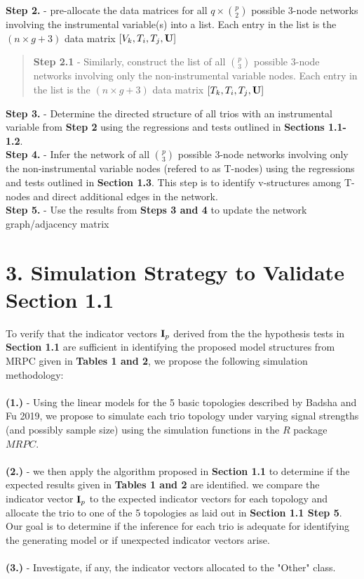 \documentclass[12pt]{report}
\begin{document}
\noindent \textbf{Step 2.} - pre-allocate the data matrices for all $q\times {p\choose 2}$ possible 3-node networks involving the instrumental variable(s) into a list. Each entry in the list is the $(n \times g+3)$ data matrix $[V_k, T_i, T_j, {\bf U}]$ 
\begin{quote}
\textbf{Step 2.1} - Similarly, construct the list of all $p\choose 3$ possible 3-node networks involving only the non-instrumental variable nodes. Each entry in the list is the $(n \times g+3)$ data matrix $[T_k, T_i, T_j, {\bf U}]$
\end{quote}


\noindent \textbf{Step 3.} - Determine the directed structure of all trios with an instrumental variable from \textbf{Step 2} using the regressions and tests outlined in \textbf{Sections 1.1-1.2}. \\

\noindent \textbf{Step 4.} -  Infer the network of all $p\choose 3$ possible 3-node networks involving only the non-instrumental variable nodes (refered to as T-nodes) using the regressions and tests outlined in \textbf{Section 1.3}. This step is to identify v-structures among T-nodes and direct additional edges in the network. \\

\noindent \textbf{Step 5.} - Use the results from \textbf{Steps 3 and 4} to update the network graph/adjacency matrix

\section*{3. Simulation Strategy to Validate Section 1.1}

To verify that the indicator vectors ${\bf I}_p$ derived from the the hypothesis tests in \textbf{Section 1.1} are sufficient in identifying the proposed model structures from MRPC given in \textbf{Tables 1 and 2}, we propose the following simulation methodology: \\
\\

\noindent \textbf{(1.)} - Using the linear models for the 5 basic topologies described by Badsha and Fu 2019, we propose to simulate each trio topology under varying signal strengths (and possibly sample size) using the simulation functions in the $R$ package $MRPC$.\\
\\
\noindent \textbf{(2.)}  - we then apply the algorithm proposed in \textbf{Section 1.1} to determine if the expected results given in \textbf{ Tables 1 and 2} are identified. we compare the indicator vector ${\bf I}_p$ to the expected indicator vectors for each topology and allocate the trio to one of the 5 topologies as laid out in \textbf{Section 1.1 Step 5}. Our goal is to determine if the inference for each trio is adequate for identifying the generating model or if unexpected indicator vectors arise. \\
\\
\textbf{(3.)} - Investigate, if any, the indicator vectors allocated to the "Other" class. 
\end{document}
